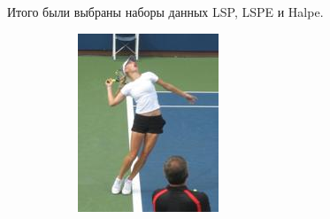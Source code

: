 Итого были выбраны наборы данных LSP, LSPE и Halpe. \begin{figure}[h]
\begin{subfigure}[b]{.2\textwidth}
	\centering
	\includegraphics[height=\textwidth]{./images/LSP1}
\end{subfigure}
\begin{subfigure}[b]{.1\textwidth}
	\centering

\end{subfigure}
\end{figure}
